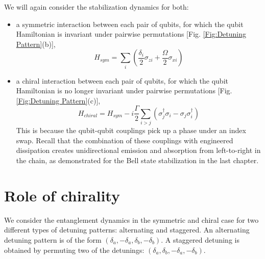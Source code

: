 %
\par
%
We will again consider the stabilization dynamics for both:
%
\begin{itemize}
\item a symmetric interaction between each pair of qubits, for which the qubit Hamiltonian is invariant under pairwise permutations [Fig. \ref{Fig:Detuning Pattern}(b)],
\begin{equation}
    H_{sym} = \sum_i \left( \frac{\delta_i}{2} \sigma_{zi} + \frac{\Omega}{2} \sigma_{xi} \right)
\end{equation}
\item a chiral interaction between each pair of qubits, for which the qubit Hamiltonian is no longer invariant under pairwise permutations [Fig. \ref{Fig:Detuning Pattern}(c)],
\begin{equation}
   H_{chiral} = H_{sym} - i \frac{\Gamma}{2} \sum_{i > j} \left( \sigma_j^\dagger \sigma_i - \sigma_j \sigma_i^\dagger \right)
\end{equation}
This is because the qubit-qubit couplings pick up a phase under an index swap. Recall that the combination of these couplings with engineered dissipation creates unidirectional emission and absorption from left-to-right in the chain, as demonstrated for the Bell state stabilization in the last chapter.
\end{itemize}
%
%
%
%
\section{Role of chirality}
%
We consider the entanglement dynamics in the symmetric and chiral case for two different types of detuning patterns: alternating and staggered. An alternating detuning pattern is of the form $(\delta_a , - \delta_a , \delta_b , - \delta_b )$. A staggered detuning is obtained by permuting two of the detunings: $(\delta_a , \delta_b , -\delta_a , - \delta_b )$.
%
\par
%
